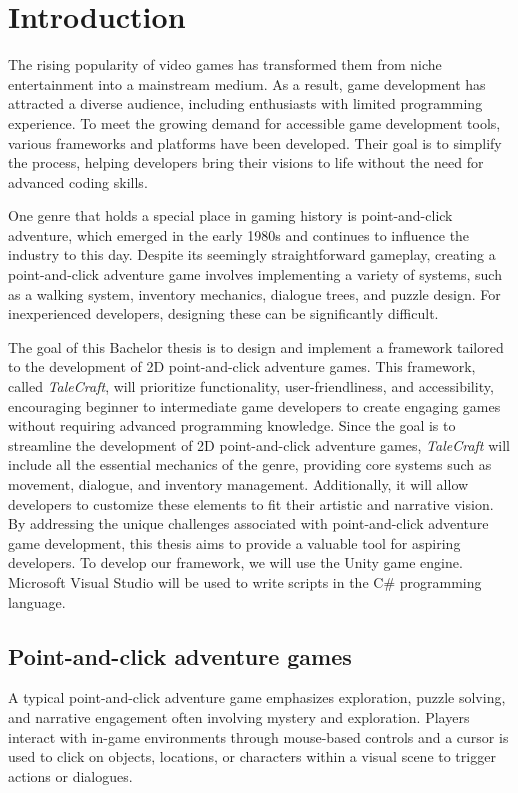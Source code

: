 \chapter{Introduction}
The rising popularity of video games has transformed them from niche entertainment into a mainstream medium. As a result, game development has attracted a diverse audience, including enthusiasts with limited programming experience. To meet the growing demand for accessible game development tools, various frameworks and platforms have been developed. Their goal is to simplify the process, helping developers bring their visions to life without the need for advanced coding skills.

One genre that holds a special place in gaming history is point-and-click adventure, which emerged in the early 1980s and continues to influence the industry to this day. Despite its seemingly straightforward gameplay, creating a point-and-click adventure game involves implementing a variety of systems, such as a walking system, inventory mechanics, dialogue trees, and puzzle design. For inexperienced developers, designing these can be significantly difficult.

The goal of this Bachelor thesis is to design and implement a framework tailored to the development of 2D point-and-click adventure games. This framework, called \textit{TaleCraft}, will prioritize functionality, user-friendliness, and accessibility, encouraging beginner to intermediate game developers to create engaging games without requiring advanced programming knowledge. Since the goal is to streamline the development of 2D point-and-click adventure games, \textit{TaleCraft} will include all the essential mechanics of the genre, providing core systems such as movement, dialogue, and inventory management. Additionally, it will allow developers to customize these elements to fit their artistic and narrative vision. By addressing the unique challenges associated with point-and-click adventure game development, this thesis aims to provide a valuable tool for aspiring developers. To develop our framework, we will use the Unity game engine. Microsoft Visual Studio will be used to write scripts in the C\# programming language. 

\section{Point-and-click adventure games}
A typical point-and-click adventure game emphasizes exploration, puzzle solving, and narrative engagement often involving mystery and exploration. Players interact with in-game environments through mouse-based controls and a cursor is used to click on objects, locations, or characters within a visual scene to trigger actions or dialogues. 

